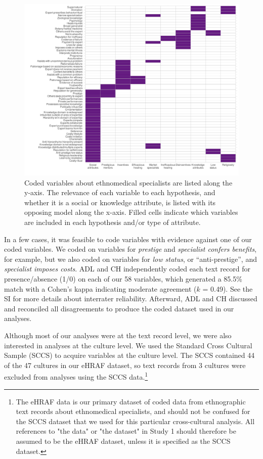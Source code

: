 \documentclass[
  11pt,
]{article}
\begin{document}
\begin{figure}[p]

{\centering \includegraphics{magic-healers-article2_files/figure-latex/ehraftilevars-1} 

}

\caption{Coded variables about ethnomedical specialists are listed along the y-axis. The relevance of each variable to each hypothesis, and whether it is a social or knowledge attribute, is listed with its opposing model along the x-axis. Filled cells indicate which variables are included in each hypothesis and/or type of attribute.}\label{fig:ehraftilevars}
\end{figure}

In a few cases, it was feasible to code variables with evidence against one of our coded variables. We coded on variables for \emph{prestige} and \emph{specialist confers benefits}, for example, but we also coded on variables for \emph{low status}, or ``anti-prestige'', and \emph{specialist imposes costs}. ADL and CH independently coded each text record for presence/absence (1/0) on each of our 58 variables, which generated a 85.5\% match with a Cohen's kappa indicating moderate agreement (\(k\) = 0.49). See the SI for more details about interrater reliability. Afterward, ADL and CH discussed and reconciled all disagreements to produce the coded dataset used in our analyses.

Although most of our analyses were at the text record level, we were also interested in analyses at the culture level. We used the Standard Cross Cultural Sample (SCCS) to acquire variables at the culture level. The SCCS contained 44 of the 47 cultures in our eHRAF dataset, so text records from 3 cultures were excluded from analyses using the SCCS data.\footnote{The eHRAF data is our primary dataset of coded data from ethnographic text records about ethnomedical specialists, and should not be confused for the SCCS dataset that we used for this particular cross-cultural analysis. All references to "the data" or "the dataset" in Study 1 should therefore be assumed to be the eHRAF dataset, unless it is specified as the SCCS dataset.}
\end{document}
